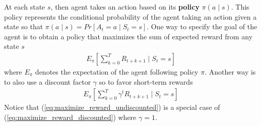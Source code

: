At each state $s$, then agent takes an action based on its \textbf{policy} $\pi(a \mid s)$.
This policy represents the conditional probability of the agent taking an action given a state so that
$\pi(a \mid s) = Pr[ A_{t} = a \mid  S_t = s]$.
One way to specify the goal of the agent is to obtain a policy that maximizes the sum of expected reward from any state $s$
\begin{align}
    \label{eq:maximize_reward_undiscounted}
    \mathit{E}_{\pi}\left[\sum_{k=0}^{T}  R_{t+k+1} \mid S_t = s\right]
\end{align}
where $\mathit{E}_{\pi}$ denotes the expectation of the agent following policy $\pi$.
Another way is to also use a discount factor $\gamma$ so to favor short-term rewards
\begin{align}
    \label{eq:maximize_reward_discounted}
    \mathit{E}_{\pi}\left[\sum_{k=0}^{T} \gamma^{t} R_{t+k+1} \mid S_t = s\right]
\end{align}
Notice that (\ref{eq:maximize_reward_undiscounted}) is a special case of (\ref{eq:maximize_reward_discounted}) where $\gamma = 1$.


